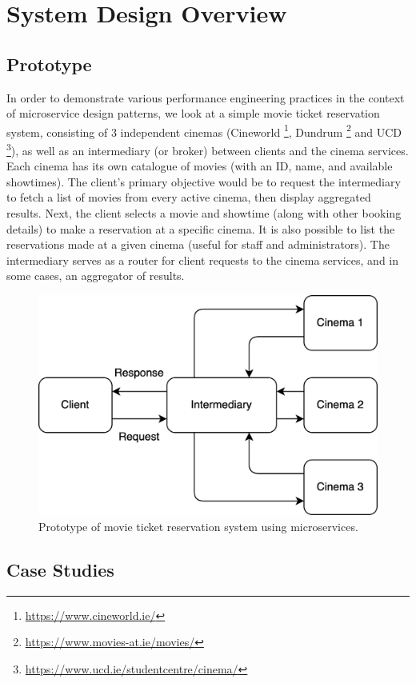 \chapter{System Design Overview}

\section{Prototype}

In order to demonstrate various performance engineering practices in the context of microservice design patterns, we look at a simple movie ticket reservation system, consisting of 3 independent cinemas (Cineworld \footnote{\url{https://www.cineworld.ie/}}, Dundrum \footnote{\url{https://www.movies-at.ie/movies/}} and UCD \footnote{\url{https://www.ucd.ie/studentcentre/cinema/}}), as well as an intermediary (or broker) between clients and the cinema services. Each cinema has its own catalogue of movies (with an ID, name, and available showtimes). The client's primary objective would be to request the intermediary to fetch a list of movies from every active cinema, then display aggregated results. Next, the client selects a movie and showtime (along with other booking details) to make a reservation at a specific cinema. It is also possible to list the reservations made at a given cinema (useful for staff and administrators). The intermediary serves as a router for client requests to the cinema services, and in some cases, an aggregator of results.


\begin{figure}[H]
  \centering
  \includegraphics[width=0.5\linewidth]{./assets/diagrams/outline-arch.png}
  \caption{Prototype of movie ticket reservation system using microservices.}
  \label{fig:outline-arch}
\end{figure}

\section{Case Studies}

